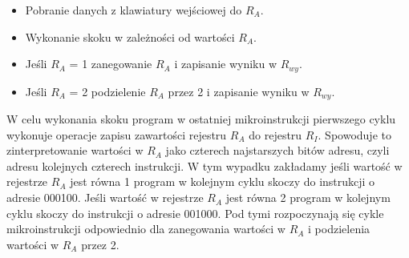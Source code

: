 \documentclass[../main.tex]{subfiles}
\begin{document}
    \begin{itemize}
        \item Pobranie danych z klawiatury wejściowej do $R_A$.
        \item Wykonanie skoku w zależności od wartości $R_A$.
        \item Jeśli $R_A$ = 1 zanegowanie $R_A$ i zapisanie wyniku w $R_{wy}$.
        \item Jeśli $R_A$ = 2 podzielenie $R_A$ przez 2 i zapisanie wyniku w $R_{wy}$.
    \end{itemize}

    W celu wykonania skoku program w ostatniej mikroinstrukcji pierwszego cyklu wykonuje operacje zapisu zawartości rejestru $R_A$ do rejestru $R_I$. 
    Spowoduje to zinterpretowanie wartości w $R_A$ jako czterech najstarszych bitów adresu, czyli adresu kolejnych czterech instrukcji.
    W tym wypadku zakładamy jeśli wartość w rejestrze $R_A$ jest równa 1 program w kolejnym cyklu skoczy do instrukcji o adresie 000100.
    Jeśli wartość w rejestrze $R_A$ jest równa 2 program w kolejnym cyklu skoczy do instrukcji o adresie 001000. Pod tymi rozpoczynają się
    cykle mikroinstrukcji odpowiednio dla zanegowania wartości w $R_A$ i podzielenia wartości w $R_A$ przez 2.
\end{document}

